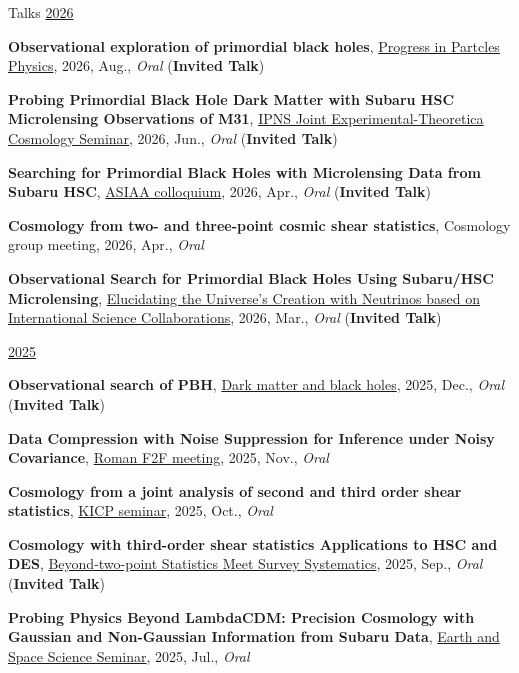 \begin{rSection}{Talks}
\underline{2026}
\begin{etaremune}
\setcounter{enumi}{52}
\item \textbf{Observational exploration of primordial black holes}, \href{https://indico.yukawa.kyoto-u.ac.jp/event/95/overview}{Progress in Partcles Physics}, 2026, Aug., \textit{Oral} (\textbf{Invited Talk})
\item \textbf{Probing Primordial Black Hole Dark Matter with Subaru HSC Microlensing Observations of M31}, \href{https://cosmophysics.gitlab.io/jointseminar.gitlab.io/sugiyama20260615.html}{IPNS Joint Experimental-Theoretica Cosmology Seminar}, 2026, Jun., \textit{Oral} (\textbf{Invited Talk})
\item \textbf{Searching for Primordial Black Holes with Microlensing Data from Subaru HSC}, \href{https://www.asiaa.sinica.edu.tw/activity/colloquium.php}{ASIAA colloquium}, 2026, Apr., \textit{Oral} (\textbf{Invited Talk})
\item \textbf{Cosmology from two- and three-point cosmic shear statistics}, Cosmology group meeting, 2026, Apr., \textit{Oral}
\item \textbf{Observational Search for Primordial Black Holes Using Subaru/HSC Microlensing}, \href{https://www-kam2.icrr.u-tokyo.ac.jp/event/19/}{Elucidating the Universe's Creation with Neutrinos based on International Science Collaborations}, 2026, Mar., \textit{Oral} (\textbf{Invited Talk})
\end{etaremune}

\underline{2025}
\begin{etaremune}
\setcounter{enumi}{47}
\item \textbf{Observational search of PBH}, \href{https://indico.ipmu.jp/event/464/timetable/#20251205}{Dark matter and black holes}, 2025, Dec., \textit{Oral} (\textbf{Invited Talk})
\item \textbf{Data Compression with Noise Suppression 
for Inference under Noisy Covariance}, \href{https://roman-hlis-cosmology.caltech.edu/news/2024-f2f}{Roman F2F meeting}, 2025, Nov., \textit{Oral}
\item \textbf{Cosmology from a joint analysis of second and third order shear statistics}, \href{https://astrophysics.uchicago.edu/events/event/2530/?past=y}{KICP seminar}, 2025, Oct., \textit{Oral}
\item \textbf{Cosmology with third-order shear statistics Applications to HSC and DES}, \href{https://indico.ipmu.jp/event/460/overview}{Beyond-two-point Statistics Meet Survey Systematics}, 2025, Sep., \textit{Oral} (\textbf{Invited Talk})
\item \textbf{Probing Physics Beyond LambdaCDM: Precision Cosmology with Gaussian and Non-Gaussian Information from Subaru Data}, \href{https://www.ess.sci.osaka-u.ac.jp/researchers/seminar.html}{Earth and Space Science Seminar}, 2025, Jul., \textit{Oral}
\end{etaremune}


\end{rSection}
